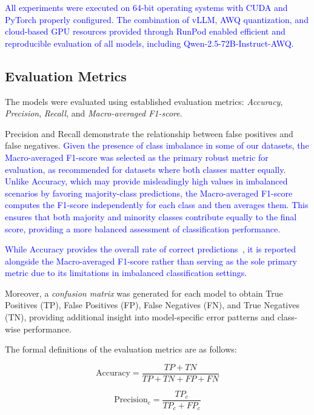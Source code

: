 \documentclass[10pt,letterpaper]{article}
\newcommand{\rev}[1]{\textcolor{blue}{#1}}
\begin{document}
\rev{
All experiments were executed on 64-bit operating systems with CUDA and PyTorch properly configured. The combination of vLLM, AWQ quantization, and cloud-based GPU resources provided through RunPod enabled efficient and reproducible evaluation of all models, including Qwen-2.5-72B-Instruct-AWQ.
}


\subsection*{Evaluation Metrics}
\label{sec:evaluation_metrics}
The models were evaluated using established evaluation metrics: \textit{Accuracy}, \textit{Precision}, \textit{Recall}, and \textit{Macro-averaged F1-score}. 

Precision and Recall demonstrate the relationship between false positives and false negatives. \rev{Given the presence of class imbalance in some of our datasets, the Macro-averaged F1-score was selected as the primary robust metric for evaluation, as recommended for datasets where both classes matter equally. Unlike Accuracy, which may provide misleadingly high values in imbalanced scenarios by favoring majority-class predictions, the Macro-averaged F1-score computes the F1-score independently for each class and then averages them. This ensures that both majority and minority classes contribute equally to the final score, providing a more balanced assessment of classification performance.}

\rev{While Accuracy provides the overall rate of correct predictions~\cite{b44}, it is reported alongside the Macro-averaged F1-score rather than serving as the sole primary metric due to its limitations in imbalanced classification settings.}

Moreover, a \textit{confusion matrix} was generated for each model to obtain True Positives (TP), False Positives (FP), False Negatives (FN), and True Negatives (TN), providing additional insight into model-specific error patterns and class-wise performance.

The formal definitions of the evaluation metrics are as follows:

\begin{equation}
\text{Accuracy} = \frac{TP + TN}{TP + TN + FP + FN}
\label{eq:accuracy}
\end{equation}

\begin{equation}
\text{Precision}_c = \frac{TP_c}{TP_c + FP_c}
\label{eq:precision}
\end{equation}
\end{document}
